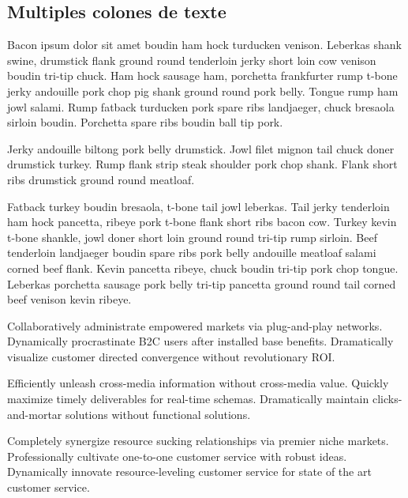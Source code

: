 \begin{spacing}{1.5}
\pagebreak

\subsection{Multiples colones de texte}
\begin{multicols}{2}


Bacon ipsum dolor sit amet boudin ham hock turducken venison. Leberkas shank swine, drumstick flank ground round tenderloin jerky short loin cow venison boudin tri-tip chuck. Ham hock sausage ham, porchetta frankfurter rump t-bone jerky andouille pork chop pig shank ground round pork belly. Tongue rump ham jowl salami. Rump fatback turducken pork spare ribs landjaeger, chuck bresaola sirloin boudin. Porchetta spare ribs boudin ball tip pork.

Jerky andouille biltong pork belly drumstick. Jowl filet mignon tail chuck doner drumstick turkey. Rump flank strip steak shoulder pork chop shank. Flank short ribs drumstick ground round meatloaf.

Fatback turkey boudin bresaola, t-bone tail jowl leberkas. Tail jerky tenderloin ham hock pancetta, ribeye pork t-bone flank short ribs bacon cow. Turkey kevin t-bone shankle, jowl doner short loin ground round tri-tip rump sirloin. Beef tenderloin landjaeger boudin spare ribs pork belly andouille meatloaf salami corned beef flank. Kevin pancetta ribeye, chuck boudin tri-tip pork chop tongue. Leberkas porchetta sausage pork belly tri-tip pancetta ground round tail corned beef venison kevin ribeye.

\end{multicols}
\begin{center}
\HRule 
\end{center}
\begin{multicols}{3}
Collaboratively administrate empowered markets via plug-and-play networks. Dynamically procrastinate B2C users after installed base benefits. Dramatically visualize customer directed convergence without revolutionary ROI.

Efficiently unleash cross-media information without cross-media value. Quickly maximize timely deliverables for real-time schemas. Dramatically maintain clicks-and-mortar solutions without functional solutions.

Completely synergize resource sucking relationships via premier niche markets. Professionally cultivate one-to-one customer service with robust ideas. Dynamically innovate resource-leveling customer service for state of the art customer service.


\end{multicols}
\end{spacing}
